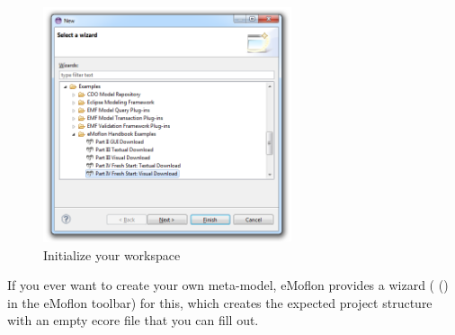 \begin{figure}[htbp]
\begin{center}
  \includegraphics[width=0.65\textwidth]{eclipse_part4FreshWizardDownload}
  \caption{Initialize your workspace}
  \label{eclipse:downPartIV}
\end{center}
\end{figure} 

If you ever want to create your own meta-model, eMoflon provides a wizard ( (\eMoflonCreateNewRepositoryProjectIcon) in the eMoflon toolbar) for this, which creates the expected project structure with an empty ecore file that you can fill out.

